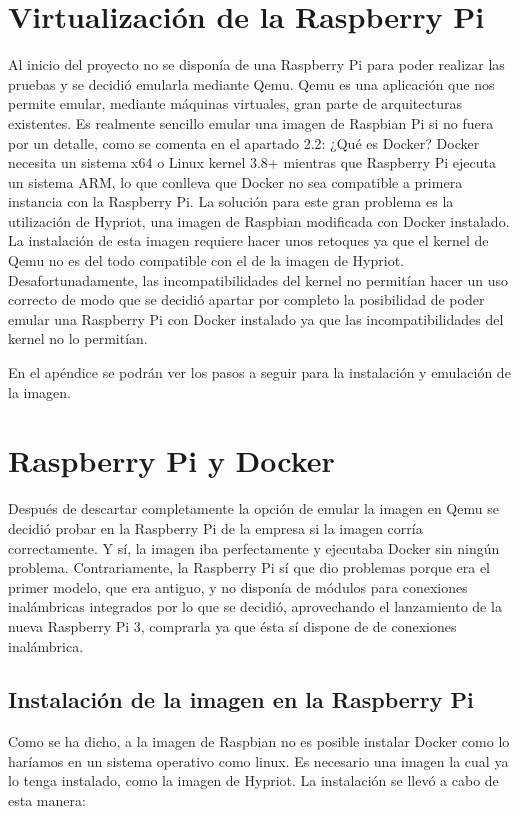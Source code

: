 \section{Virtualización de la Raspberry Pi}

Al inicio del proyecto no se disponía de una Raspberry Pi para poder realizar las pruebas y se decidió emularla mediante Qemu. 
Qemu es una aplicación que nos permite emular, mediante máquinas virtuales, gran parte de arquitecturas existentes. 
Es realmente sencillo emular una imagen de Raspbian Pi si no fuera por un detalle, como se comenta en el apartado 2.2: ¿Qué es Docker? Docker necesita un sistema x64 o Linux kernel 3.8+ mientras que Raspberry Pi ejecuta un sistema ARM, lo que conlleva que Docker no sea compatible a primera instancia con la Raspberry Pi. 
La solución para este gran problema es la utilización de Hypriot, una imagen de Raspbian modificada con Docker instalado. 
La instalación de esta imagen requiere hacer unos retoques ya que el kernel de Qemu no es del todo compatible con el de la imagen de Hypriot. Desafortunadamente, las incompatibilidades del kernel no permitían hacer un uso correcto de modo que se decidió apartar por completo la posibilidad de poder emular una Raspberry Pi con Docker instalado ya que las incompatibilidades del kernel no lo permitían.

En el apéndice se podrán ver los pasos a seguir para la instalación y emulación de la imagen. 

\section{Raspberry Pi y Docker}

Después de descartar completamente la opción de emular la imagen en Qemu se decidió probar en la Raspberry Pi de la empresa si la imagen corría correctamente. Y sí, la imagen iba perfectamente y ejecutaba Docker sin ningún problema. Contrariamente, la Raspberry Pi sí que dio problemas porque era el primer modelo, que era antiguo, y no disponía de módulos para conexiones inalámbricas integrados por lo que se decidió, aprovechando el lanzamiento de la nueva Raspberry Pi 3, comprarla ya que ésta sí dispone de de conexiones inalámbrica. 

\subsection{Instalación de la imagen en la Raspberry Pi}

Como se ha dicho, a la imagen de Raspbian no es posible instalar Docker como lo haríamos en un sistema operativo como linux. Es necesario una imagen la cual ya lo tenga instalado, como la imagen de Hypriot. La instalación se llevó a cabo de esta manera:

